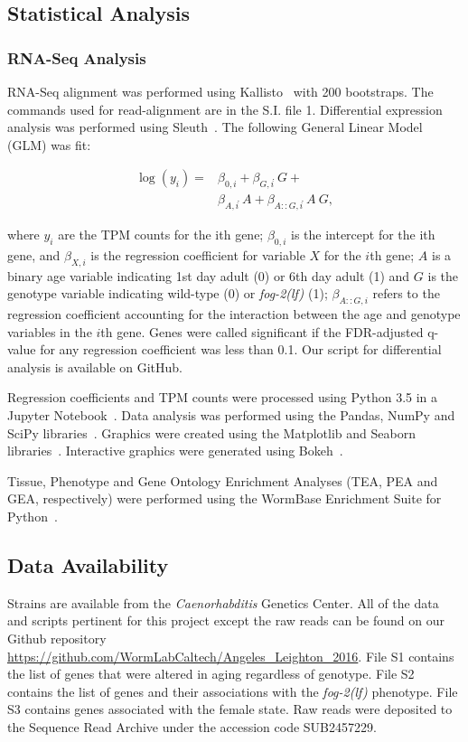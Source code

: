 \documentclass[10pt,letterpaper,twocolumn]{article}
\newcommand{\fog}{\emph{\mbox{fog-2(lf)}}}
\begin{document}
\subsection*{Statistical Analysis}
\label{sb:statistics}

\subsubsection*{RNA-Seq Analysis}
RNA-Seq alignment was performed using Kallisto~\cite{Bray2016} with 200
bootstraps. The commands used for read-alignment are in the S.I. file 1.
Differential expression analysis was performed using Sleuth~\cite{Pimentel2016}.
The following General Linear Model (GLM) was fit:

\begin{align*}
  \log(y_i) =& \beta_{0,i} + \beta_{G,i}\dot~G + \\
  &\beta_{A,i}\dot~A + \beta_{A::G,i}\dot~A~G,
  \label{eqn:GLM}
\end{align*}

where $y_i$ are the TPM counts for the ith gene; $\beta_{0,i}$ is the intercept
for the ith gene, and $\beta_{X,i}$ is the regression coefficient for variable
$X$ for the $i$th gene; $A$ is a binary age variable indicating 1st day adult
(0) or 6th day adult (1) and $G$ is the genotype variable indicating wild-type
(0) or \fog{} (1); $\beta_{A::G, i}$ refers to the regression coefficient
accounting for the interaction between the age and genotype variables in the
$i$th gene. Genes were called significant if the FDR-adjusted q-value for any
regression coefficient was less than 0.1. Our script for differential analysis
is available on GitHub.

Regression coefficients and TPM counts were processed using Python 3.5 in a
Jupyter Notebook~\cite{Perez2007}. Data analysis was performed using the Pandas,
NumPy and SciPy libraries~\cite{McKinney2011,VanDerWalt2011,Oliphant2007}.
Graphics were created using the Matplotlib and Seaborn
libraries~\cite{Waskom,Hunter2007}. Interactive graphics were generated using
Bokeh~\cite{Team2014}.

Tissue, Phenotype and Gene Ontology Enrichment
Analyses (TEA, PEA and GEA, respectively) were performed using the WormBase
Enrichment Suite for Python~\cite{Angeles-Albores2016,Angeles-Albores106369}.

\subsection*{Data Availability}
\label{sb:data_availability}
Strains are available from the \emph{Caenorhabditis} Genetics Center. All of the
data and scripts pertinent for this project except the raw reads can be found on
our Github repository
\url{https://github.com/WormLabCaltech/Angeles_Leighton_2016}. File S1
contains the list of genes that were altered in aging regardless of genotype.
File S2 contains the list of genes and their associations with the \fog{}
phenotype. File S3 contains genes associated with the female state. Raw reads
were deposited to the Sequence Read Archive under the accession code SUB2457229.
\end{document}
